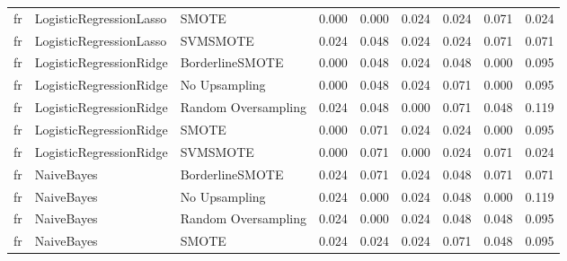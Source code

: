\begin{tabular}{lllllllll}
      fr &      LogisticRegressionLasso &               SMOTE & 0.000 &                     0.000 &                 0.024 &                  0.024 &                                   0.071 &     0.024 \\
      fr &      LogisticRegressionLasso &            SVMSMOTE & 0.024 &                     0.048 &                 0.024 &                  0.024 &                                   0.071 &     0.071 \\
      fr &      LogisticRegressionRidge &     BorderlineSMOTE & 0.000 &                     0.048 &                 0.024 &                  0.048 &                                   0.000 &     0.095 \\
      fr &      LogisticRegressionRidge &       No Upsampling & 0.000 &                     0.048 &                 0.024 &                  0.071 &                                   0.000 &     0.095 \\
      fr &      LogisticRegressionRidge & Random Oversampling & 0.024 &                     0.048 &                 0.000 &                  0.071 &                                   0.048 &     0.119 \\
      fr &      LogisticRegressionRidge &               SMOTE & 0.000 &                     0.071 &                 0.024 &                  0.024 &                                   0.000 &     0.095 \\
      fr &      LogisticRegressionRidge &            SVMSMOTE & 0.000 &                     0.071 &                 0.000 &                  0.024 &                                   0.071 &     0.024 \\
      fr &                   NaiveBayes &     BorderlineSMOTE & 0.024 &                     0.071 &                 0.024 &                  0.048 &                                   0.071 &     0.071 \\
      fr &                   NaiveBayes &       No Upsampling & 0.024 &                     0.000 &                 0.024 &                  0.048 &                                   0.000 &     0.119 \\
      fr &                   NaiveBayes & Random Oversampling & 0.024 &                     0.000 &                 0.024 &                  0.048 &                                   0.048 &     0.095 \\
      fr &                   NaiveBayes &               SMOTE & 0.024 &                     0.024 &                 0.024 &                  0.071 &                                   0.048 &     0.095 \\

\end{tabular}

